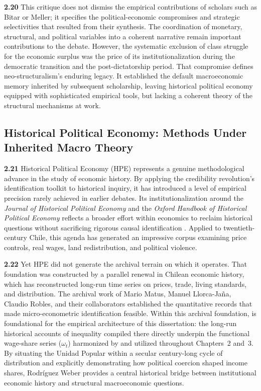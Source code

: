 \textbf{2.20} This critique does not dismiss the empirical contributions of scholars such as Bitar or 
Meller; it specifies the political-economic compromises and strategic selectivities that resulted from their synthesis. The coordination of monetary, structural, and political variables into a coherent narrative remain important contributions to the debate. However, the systematic exclusion of class struggle for the economic surplus was the price of its institutionalization during the democratic transition and the post-dictatorship period. That compromise defines neo-structuralism's enduring legacy. It established the default macroeconomic memory inherited by subsequent scholarship, leaving historical political economy equipped with sophisticated empirical tools, but lacking a coherent theory of the structural mechanisms at work.

\subsection{Historical Political Economy: Methods Under Inherited Macro Theory}
\label{sec:A4_historical_PE}

\textbf{2.21} Historical Political Economy (HPE) represents a genuine methodological advance in the study 
of economic history. By applying the credibility revolution's identification toolkit to historical inquiry, 
it has introduced a level of empirical precision rarely achieved in earlier debates. Its institutionalization 
around the \textit{Journal of Historical Political Economy} and the \textit{Oxford Handbook of Historical 
	Political Economy} reflects a broader effort within economics to reclaim historical questions without sacrificing 
rigorous causal identification \citep{Gailmard2021,JenkinsRubin2024,CharnyshFinkelGehlbach2023}. Applied to twentieth-century 
Chile, this agenda has generated an impressive corpus examining price controls, real wages, land redistribution, 
and political violence.

\textbf{2.22} Yet HPE did not generate the archival terrain on which it operates. That foundation was 
constructed by a parallel renewal in Chilean economic history, which has reconstructed long-run time series 
on prices, trade, living standards, and distribution. The archival work of Mario Matus, Manuel Llorca-Jaña, 
Claudio Robles, and their collaborators established the quantitative records that made micro-econometric 
identification feasible. Within this archival foundation, \citet{RodriguezWeber2018} is foundational for the 
empirical architecture of this dissertation: the long-run historical accounts of inequality compiled there 
directly underpin the functional wage-share series ($\omega_t$) harmonized by \citet{Astorga2023} and utilized 
throughout Chapters~2 and~3. By situating the Unidad Popular within a secular century-long cycle of distribution 
and explicitly demonstrating how political coercion shaped income shares, Rodríguez Weber provides a central 
historical bridge between institutional economic history and structural macroeconomic questions.


